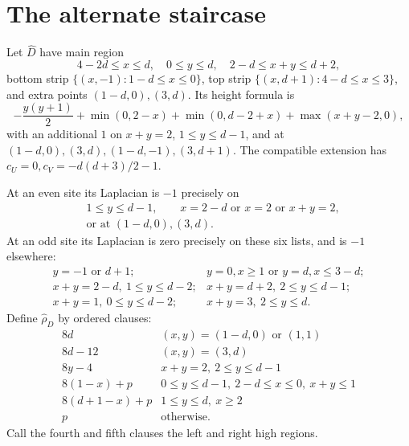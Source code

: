 \documentclass[11pt]{article}
\begin{document}
\section*{The alternate staircase}
Let $\widehat D$ have main region
\[
 4-2d\le x\le d,\quad 0\le y\le d,\quad 2-d\le x+y\le d+2,
\]
bottom strip $\{(x,-1):1-d\le x\le0\}$, top strip
$\{(x,d+1):4-d\le x\le3\}$, and extra points
$(1-d,0),(3,d)$. Its height formula is
\[
 -\frac{y(y+1)}2+\min(0,2-x)+\min(0,d-2+x)+\max(x+y-2,0),
\]
with an additional $1$ on $x+y=2$, $1\le y\le d-1$, and at
$(1-d,0),(3,d),(1-d,-1),(3,d+1)$.
The compatible extension has $c_U=0,c_V=-d(d+3)/2-1$.

At an even site its Laplacian is $-1$ precisely on
\[
\begin{split}
 &1\le y\le d-1,\qquad x=2-d\text{ or }x=2\text{ or }x+y=2,\\
 &\text{or at }(1-d,0),(3,d).
\end{split}                                                     \tag{5}
\]
At an odd site its Laplacian is zero precisely on these six lists,
and is $-1$ elsewhere:
\[
\begin{array}{ll}
y=-1\text{ or }d+1;&y=0,x\ge1\text{ or }y=d,x\le3-d;\\
x+y=2-d,\ 1\le y\le d-2;&x+y=d+2,\ 2\le y\le d-1;\\
x+y=1,\ 0\le y\le d-2;&x+y=3,\ 2\le y\le d.
\end{array}                                                     \tag{6}
\]
Define $\widehat\rho_D$ by ordered clauses:
\[
\begin{array}{c|l}
8d&(x,y)=(1-d,0)\text{ or }(1,1)\\
8d-12&(x,y)=(3,d)\\
8y-4&x+y=2,\ 2\le y\le d-1\\
8(1-x)+p&0\le y\le d-1,\ 2-d\le x\le0,\ x+y\le1\\
8(d+1-x)+p&1\le y\le d,\ x\ge2\\
p&\text{otherwise}.
\end{array}                                                     \tag{7}
\]
Call the fourth and fifth clauses the left and right high regions.
\end{document}
